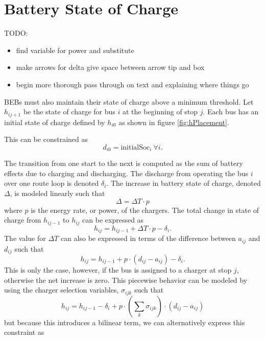 \section{Battery State of Charge}
TODO:
\begin{itemize}
	\item find variable for power and substitute
	\item make arrows for delta give space between arrow tip and box
	\item begin more thorough pass through on text and explaining where things go
\end{itemize}
BEBs must also maintain their state of charge above a minimum threshold. Let $h_{ij+1}$ be the state of charge for bus $i$ at the beginning of stop $j$. Each bus has an initial state of charge defined by $h_{i0}$ as shown in figure \ref{fig:hPlacement}. 

This can be constrained as
\begin{equation}
	d_{i0} = \text{initialSoc}_{i} \ \forall i.
\end{equation}

The transition from one start to the next is computed as the sum of battery effects due to charging and discharging. The discharge from operating the bus $i$ over one route loop is denoted $\delta_i$. The increase in battery state of charge, denoted $\Delta$, is modeled linearly such that
\begin{equation}
	\Delta = \Delta T\cdot p
\end{equation}
where $p$ is the energy rate, or power, of the chargers. The total change in state of charge from $h_{ij-1}$ to $h_{ij}$ can be expressed as
\begin{equation}
	h_{ij} = h_{ij-1} + \Delta T\cdot p - \delta_i.
\end{equation}
The value for $\Delta T$ can also be expressed in terms of the difference between $a_{ij}$ and $d_{ij}$ such that
\begin{equation}
	h_{ij} = h_{ij-1} + p\cdot \left ( d_{ij} - a_{ij} \right ) - \delta_i.
\end{equation}
This is only the case, however, if the bus is assigned to a charger at stop $j$, otherwise the net increase is zero. This piecewise behavior can be modeled by using the charger selection variables, $\sigma_{ijk}$ such that
\begin{equation}
	h_{ij} = h_{ij-1} - \delta_i + p\cdot\left(\sum_k\sigma_{ijk}\right )\cdot(d_{ij} - a_{ij}) 
\end{equation}
but because this introduces a bilinear term, we can alternatively express this constraint as
